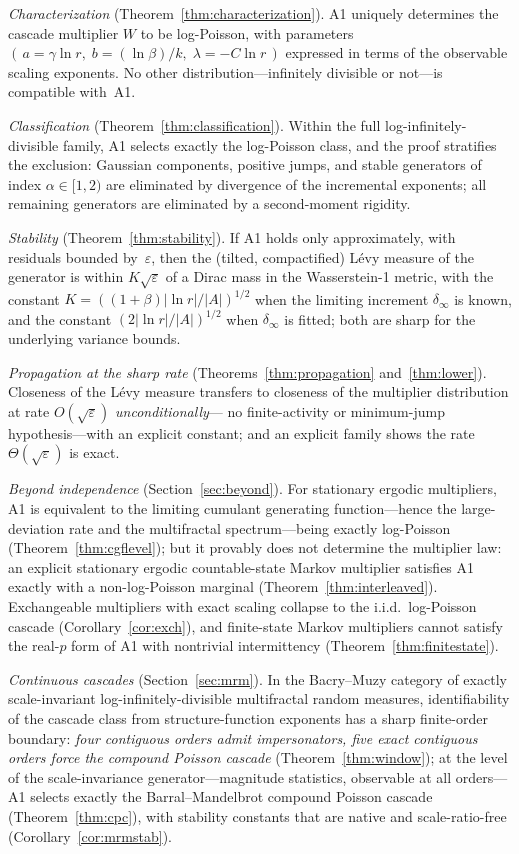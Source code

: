 \documentclass[pdflatex,sn-mathphys-num]{sn-jnl}
\theoremstyle{thmstyleone}
\theoremstyle{thmstyletwo}
\theoremstyle{thmstylethree}
\begin{document}
\emph{Characterization}
(Theorem~\ref{thm:characterization}).  A1 uniquely determines the
cascade multiplier $W$ to be log-Poisson, with parameters
$(\,a = \gamma\ln r,\; b = (\ln\beta)/k,\; \lambda = -C\ln r\,)$
expressed in terms of the observable scaling exponents.  No other
distribution---infinitely divisible or not---is compatible with~A1.

\emph{Classification}
(Theorem~\ref{thm:classification}).  Within the full
log-infinitely-divisible family, A1 selects exactly the log-Poisson
class, and the proof stratifies the exclusion: Gaussian components,
positive jumps, and stable generators of index $\alpha \in [1,2)$ are
eliminated by divergence of the incremental exponents; all remaining
generators are eliminated by a second-moment rigidity.

\emph{Stability}
(Theorem~\ref{thm:stability}).  If A1 holds only approximately, with
residuals bounded by~$\varepsilon$, then the (tilted, compactified)
L\'evy measure of the generator is within $K\sqrt{\varepsilon}$ of a
Dirac mass in the Wasserstein-1 metric, with the constant
$K = ((1+\beta)|\ln r|/|A|)^{1/2}$ when the limiting increment
$\delta_\infty$ is known, and the constant
$(2|\ln r|/|A|)^{1/2}$ when $\delta_\infty$ is fitted; both are
sharp for the underlying variance bounds.

\emph{Propagation at the sharp rate}
(Theorems~\ref{thm:propagation} and~\ref{thm:lower}).  Closeness of
the L\'evy measure transfers to closeness of the multiplier
distribution at rate $O(\sqrt\varepsilon)$ \emph{unconditionally}---%
no finite-activity or minimum-jump hypothesis---with an explicit
constant; and an explicit family shows the rate
$\Theta(\sqrt\varepsilon)$ is exact.

\emph{Beyond independence}
(Section~\ref{sec:beyond}).  For stationary ergodic multipliers, A1
is equivalent to the limiting cumulant generating function---hence
the large-deviation rate and the multifractal spectrum---being
exactly log-Poisson (Theorem~\ref{thm:cgflevel}); but it provably
does not determine the multiplier law: an explicit stationary
ergodic countable-state Markov multiplier satisfies A1 exactly with
a non-log-Poisson marginal (Theorem~\ref{thm:interleaved}).
Exchangeable multipliers with exact scaling collapse to the i.i.d.\
log-Poisson cascade (Corollary~\ref{cor:exch}), and finite-state
Markov multipliers cannot satisfy the real-$p$ form of A1 with
nontrivial intermittency (Theorem~\ref{thm:finitestate}).

\emph{Continuous cascades}
(Section~\ref{sec:mrm}).  In the Bacry--Muzy category of exactly
scale-invariant log-infinitely-divisible multifractal random
measures, identifiability of the cascade class from
structure-function exponents has a sharp
finite-order boundary: \emph{four contiguous orders admit
impersonators, five exact contiguous orders force the compound
Poisson cascade} (Theorem~\ref{thm:window}); at the level of the
scale-invariance
generator---magnitude statistics, observable at all orders---A1
selects exactly the Barral--Mandelbrot compound Poisson cascade
(Theorem~\ref{thm:cpc}), with stability constants that are native
and scale-ratio-free (Corollary~\ref{cor:mrmstab}).
\end{document}

